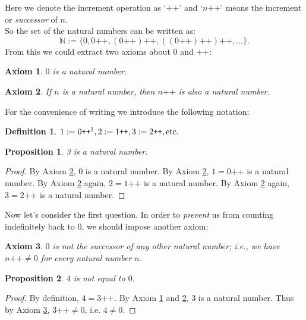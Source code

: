 \documentclass[a4paper,oneside]{book}
\newtheorem*{proof}{\textit{Proof.}}
\newtheorem{definition}{Definition}[section]
\newtheorem{axiom}{Axiom}[chapter]
\newtheorem{proposition}{Proposition}[section]
\begin{document}
			Here we denote the increment operation as `$\texttt{++}$' and `$n\texttt{++}$' means the increment or \textit{successor} of $n$.\\
			So the set of the natural numbers can be written as:
			\begin{equation*}
				\mathbb{N} := \{0,0\texttt{++},(0\texttt{++})\texttt{++},((0\texttt{++})\texttt{++})\texttt{++},...\}.
			\end{equation*}
			From this we could extract two axioms about $0$ and $\texttt{++}$:
			\begin{axiom}
				\label{ax:peano1}
				$0$ is a natural number.
			\end{axiom}
			\begin{axiom}
				\label{ax:peano2}
				If $n$ is a natural number, then $n\texttt{++}$ is also a natural number.
			\end{axiom}
			For the convenience of writing we introduce the following notation:
			\begin{definition}
				$1 :=0\texttt{++}\footnotemark, 2 :=1\texttt{++}, 3 :=2\texttt{++}, \mathrm{etc.}$ 
			\end{definition}
			\begin{proposition}
				3 is a natural number.
			\end{proposition}
			\begin{proof}
				By Axiom \ref{ax:peano2}, $0$ is a natural number. By Axiom \ref{ax:peano2}, $1 = 0\texttt{++}$ is a natural number. By Axiom \ref{ax:peano2} again, $2 = 1\texttt{++}$ is a natural number. By Axiom \ref{ax:peano2} again, $3 = 2\texttt{++}$ is a natural number.
			\end{proof}
			Now let's consider the first question. In order to \textit{prevent} us from counting indefinitely back to $0$, we should impose another axiom:
			\begin{axiom}
				\label{ax:peano3}
				$0$ is not the successor of any other natural number; i.e., we have $n\texttt{++} \neq 0$ for every natural number $n$.
			\end{axiom}
			\begin{proposition}
				\label{pro:4<>0}
				$4$ is not equal to $0$.
			\end{proposition}
			\begin{proof}
				By definition, $4=3\texttt{++}$. By Axiom \ref{ax:peano1} and \ref{ax:peano2}, 3 is a natural number. Thus by Axiom \ref{ax:peano3}, $3\texttt{++} \neq 0$, i.e. $4 \neq 0$.
			\end{proof}
\end{document}
